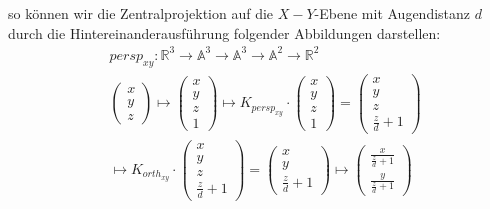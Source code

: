 \documentclass{beamer}
\begin{document}
so können wir die Zentralprojektion auf die $X-Y$-Ebene mit Augendistanz $d$ durch die Hintereinanderausführung folgender Abbildungen darstellen:
\begin{align*}
& persp_{xy} :\mathbb{R}^3   \to \mathbb{A}^3    \to  \mathbb{A}^3    \to \mathbb{A}^2    \to \mathbb{R}^2  \\
&\begin{pmatrix} x \\ y \\ z \end{pmatrix} \mapsto \begin{pmatrix} x \\ y \\ z \\ 1 \end{pmatrix}   \mapsto K_{persp_{xy}} \cdot  \begin{pmatrix} x \\ y \\ z \\ 1 \end{pmatrix} =   \begin{pmatrix} x \\ y \\ z \\ \frac{z}{d} + 1 \end{pmatrix} \\
 & \mapsto K_{orth_{xy}} \cdot   \begin{pmatrix} x \\ y \\ z \\ \frac{z}{d} + 1 \end{pmatrix}=   \begin{pmatrix} x \\ y \\ \frac{z}{d} + 1 \end{pmatrix}   \mapsto 
 \begin{pmatrix}  \frac{x}{\frac{z}{d} +1 } \\   \frac{y}{\frac{z}{d} +1 } \end{pmatrix}
 \end{align*}
\end{document}
